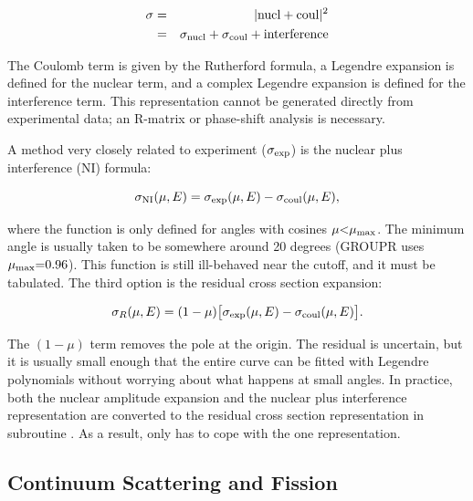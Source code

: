 \begin{eqnarray}
   \sigma&=&|{\rm nucl} + {\rm coul}|^2\nonumber\\
         &=& \sigma_{\rm nucl}+\sigma_{\rm coul}+{\rm interference}
\end{eqnarray}

\noindent
The Coulomb term is given by the Rutherford formula, a Legendre
expansion is defined for the nuclear term, and a complex Legendre
expansion is defined for the interference term.  This representation
cannot be generated directly from experimental data; an R-matrix
or phase-shift analysis is necessary.

A method very closely related to experiment ($\sigma_{\rm exp}$) is the
nuclear plus interference (NI) formula:

\begin{equation}
   \sigma_{\rm NI}(\mu,E)=\sigma_{\rm exp}(\mu,E)
      -\sigma_{\rm coul}(\mu,E),
\end{equation}

\noindent
where the function is only defined for angles with cosines
$\mu{<}\mu_{\rm max}$.  The minimum angle is usually taken to be
somewhere around 20 degrees (GROUPR uses $\mu_{\rm max}{=}0.96$).
This function is still ill-behaved near the cutoff, and it must be
tabulated.  The third option is the residual cross section expansion:

\begin{equation}
   \sigma_R(\mu,E)=(1-\mu)\bigl[\sigma_{\rm exp}(\mu,E)
      -\sigma_{\rm coul}(\mu,E)\bigr].
\end{equation}

\noindent
The $(1-\mu)$ term removes the pole at the origin.  The residual is
uncertain, but it is usually small enough that the entire curve can be
fitted with Legendre polynomials without worrying about what happens at
small angles.   In practice, both the nuclear amplitude expansion and
the nuclear plus interference representation are converted to the
residual cross section representation in subroutine
.  As a result,
 only has to cope with
the one representation.


\subsection{Continuum Scattering and Fission}
\label{ssGROUPR_Continuum}

